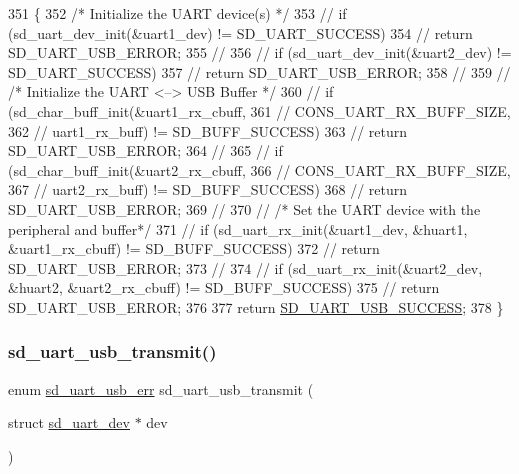 \begin{DoxyCode}
351 \{
352     \textcolor{comment}{/* Initialize the UART device(s) */}
353 \textcolor{comment}{//  if (sd\_uart\_dev\_init(&uart1\_dev) != SD\_UART\_SUCCESS)}
354 \textcolor{comment}{//      return SD\_UART\_USB\_ERROR;}
355 \textcolor{comment}{//  }
356 \textcolor{comment}{//  if (sd\_uart\_dev\_init(&uart2\_dev) != SD\_UART\_SUCCESS)}
357 \textcolor{comment}{//      return SD\_UART\_USB\_ERROR;}
358 \textcolor{comment}{//  }
359 \textcolor{comment}{//  /* Initialize the UART <--> USB Buffer */}
360 \textcolor{comment}{//  if (sd\_char\_buff\_init(&uart1\_rx\_cbuff, }
361 \textcolor{comment}{//                CONS\_UART\_RX\_BUFF\_SIZE, }
362 \textcolor{comment}{//                uart1\_rx\_buff) != SD\_BUFF\_SUCCESS)}
363 \textcolor{comment}{//      return SD\_UART\_USB\_ERROR;}
364 \textcolor{comment}{//  }
365 \textcolor{comment}{//  if (sd\_char\_buff\_init(&uart2\_rx\_cbuff, }
366 \textcolor{comment}{//                CONS\_UART\_RX\_BUFF\_SIZE,}
367 \textcolor{comment}{//                uart2\_rx\_buff) != SD\_BUFF\_SUCCESS)}
368 \textcolor{comment}{//      return SD\_UART\_USB\_ERROR;}
369 \textcolor{comment}{//  }
370 \textcolor{comment}{//  /* Set the UART device with the peripheral and buffer*/}
371 \textcolor{comment}{//  if (sd\_uart\_rx\_init(&uart1\_dev, &huart1, &uart1\_rx\_cbuff) != SD\_BUFF\_SUCCESS)}
372 \textcolor{comment}{//      return SD\_UART\_USB\_ERROR;}
373 \textcolor{comment}{//  }
374 \textcolor{comment}{//  if (sd\_uart\_rx\_init(&uart2\_dev, &huart2, &uart2\_rx\_cbuff) != SD\_BUFF\_SUCCESS)}
375 \textcolor{comment}{//      return SD\_UART\_USB\_ERROR;}
376 
377     \textcolor{keywordflow}{return} \mbox{\hyperlink{group___s_d___u_a_r_t___u_s_b___bridge___types_gga7e4773a8cce69fafe541cad55985f146a5f1ee74f25f6a6f1aa6b771dc91abe11}{SD\_UART\_USB\_SUCCESS}};
378 \}
\end{DoxyCode}
\mbox{\label{group___s_d___u_a_r_t___u_s_b___bridge_ga7277fee3051720471dd68980c4928cbc}} 
\subsubsection{\texorpdfstring{sd\+\_\+uart\+\_\+usb\+\_\+transmit()}{sd\_uart\_usb\_transmit()}}
{\footnotesize\ttfamily enum \mbox{\hyperlink{group___s_d___u_a_r_t___u_s_b___bridge___types_ga7e4773a8cce69fafe541cad55985f146}{sd\+\_\+uart\+\_\+usb\+\_\+err}} sd\+\_\+uart\+\_\+usb\+\_\+transmit (\begin{DoxyParamCaption}\item[{struct \mbox{\hyperlink{structsd__uart__dev}{sd\+\_\+uart\+\_\+dev}} $\ast$}]{dev }\end{DoxyParamCaption})\hspace{0.3cm}{\ttfamily [inline]}}



